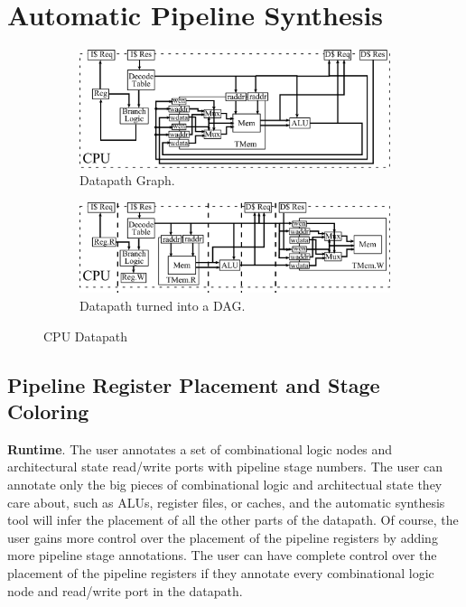 \section{Automatic Pipeline Synthesis}
\begin{figure}[htb]
\centering
  \begin{subfigure}[t]{0.8\textwidth}
  \centering
  \includegraphics[width=\textwidth]{figures/pipeline.pdf}
  \caption{Datapath Graph.}
  \label{fig:datapathgrah}
  \end{subfigure}
  \begin{subfigure}[t]{0.8\textwidth}
  \vspace{20pt}
  \centering
  \includegraphics[width=\textwidth]{figures/pipelinedag.pdf}
  \caption{Datapath turned into a DAG.}
  \label{fig:datapathdag}
  \end{subfigure}
\caption{CPU Datapath}
\label{fig:datapath}
\end{figure}

\subsection{Pipeline Register Placement and Stage Coloring}
{\bf Runtime}. The user annotates a set of combinational logic nodes and architectural state read/write ports with pipeline stage numbers. The user can annotate only the big pieces of combinational logic and architectual state they care about, such as ALUs, register files, or caches, and the automatic synthesis tool will infer the placement of all the other parts of the datapath. Of course, the user gains more control over the placement of the pipeline registers by adding more pipeline stage annotations. The user can have complete control over the placement of the pipeline registers if they annotate every combinational logic node and read/write port in the datapath.

